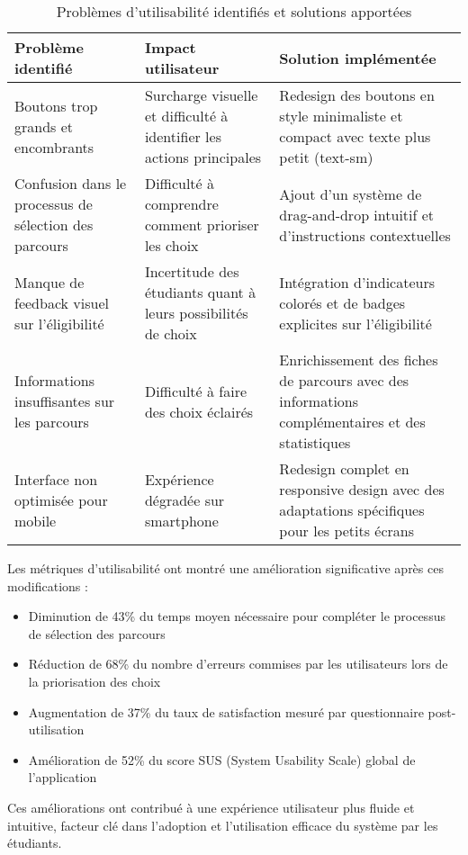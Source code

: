 \documentclass[french,12pt]{report} %
\begin{document}
\begin{table}[H]
\centering
\begin{tabular}{|p{4cm}|p{4cm}|p{4cm}|}
\hline
\textbf{Problème identifié} & \textbf{Impact utilisateur} & \textbf{Solution implémentée} \\ \hline
\hline
Boutons trop grands et encombrants & Surcharge visuelle et difficulté à identifier les actions principales & Redesign des boutons en style minimaliste et compact avec texte plus petit (text-sm) \\ \hline
Confusion dans le processus de sélection des parcours & Difficulté à comprendre comment prioriser les choix & Ajout d'un système de drag-and-drop intuitif et d'instructions contextuelles \\ \hline
Manque de feedback visuel sur l'éligibilité & Incertitude des étudiants quant à leurs possibilités de choix & Intégration d'indicateurs colorés et de badges explicites sur l'éligibilité \\ \hline
Informations insuffisantes sur les parcours & Difficulté à faire des choix éclairés & Enrichissement des fiches de parcours avec des informations complémentaires et des statistiques \\ \hline
Interface non optimisée pour mobile & Expérience dégradée sur smartphone & Redesign complet en responsive design avec des adaptations spécifiques pour les petits écrans \\ \hline
\end{tabular}
\caption{Problèmes d'utilisabilité identifiés et solutions apportées}
\label{table:usability}
\end{table}

Les métriques d'utilisabilité ont montré une amélioration significative après ces modifications :

\begin{itemize}
    \item Diminution de 43\% du temps moyen nécessaire pour compléter le processus de sélection des parcours
    \item Réduction de 68\% du nombre d'erreurs commises par les utilisateurs lors de la priorisation des choix
    \item Augmentation de 37\% du taux de satisfaction mesuré par questionnaire post-utilisation
    \item Amélioration de 52\% du score SUS (System Usability Scale) global de l'application
\end{itemize}

Ces améliorations ont contribué à une expérience utilisateur plus fluide et intuitive, facteur clé dans l'adoption et l'utilisation efficace du système par les étudiants.
\end{document}
